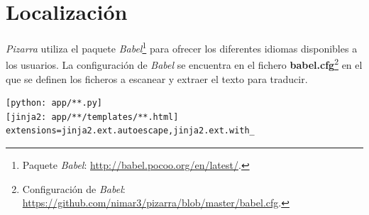 \documentclass[11pt,spanish,listoffigures,listoftables]{tfgetsinf}
\begin{document}
\section{Localización}

\textit{Pizarra} utiliza el \Gls{paquete} \textit{Babel}\footnote{Paquete \textit{Babel}: \url{http://babel.pocoo.org/en/latest/}.} para ofrecer los diferentes idiomas disponibles a los usuarios. La configuración de \textit{Babel} se encuentra en el fichero \textbf{babel.cfg}\footnote{Configuración de \textit{Babel}: \url{https://github.com/nimar3/pizarra/blob/master/babel.cfg}.} en el que se definen los ficheros a escanear y extraer el texto para traducir. \newline

\begin{lstlisting}[style=ascii-tree]
[python: app/**.py]
[jinja2: app/**/templates/**.html]
extensions=jinja2.ext.autoescape,jinja2.ext.with_
\end{lstlisting}
\end{document}
